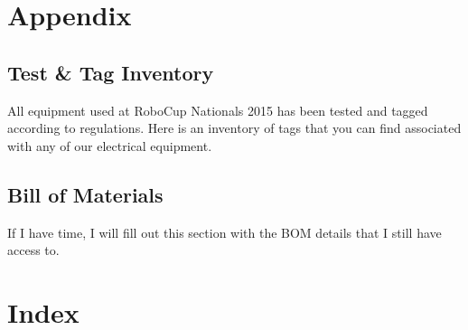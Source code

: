 \documentclass[12pt]{report}
\begin{document}
    
    
    \pagebreak
    
    
    \setcounter{page}{1}
    
        
    
    
    
    
    
    \part{Appendix}
    	\chapter{Test \& Tag Inventory}
        	All equipment used at RoboCup Nationals 2015 has been tested and tagged according to regulations. Here is an inventory of tags that you can find associated with any of our electrical equipment.\\
        	
            
		\chapter{Bill of Materials}
        	If I have time, I will fill out this section with the BOM details that I still have access to.\\
            
	\part{Index}            
    	\printindex    	        

\end{document}
